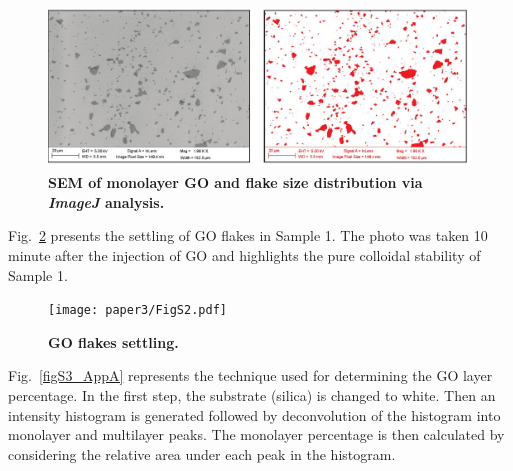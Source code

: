 \newpage
\begin{figure}[h!]
  \centering
  \includegraphics[width=6in]{paper3/FigS1.pdf}
  \caption{\textbf{SEM of monolayer GO and flake size distribution via \textit{ImageJ} analysis.}}
  \label{figS1_AppA}
\end{figure}

Fig.~\ref{figS2_AppA} presents the settling of GO flakes in Sample 1. The photo was taken 10 minute after the injection of GO and highlights the pure colloidal stability of Sample 1.

\begin{figure}[h!]
  \centering
  \texttt{[image: paper3/FigS2.pdf]}
  \caption{\textbf{GO flakes settling.}}
  \label{figS2_AppA}
\end{figure}


Fig.~\ref{figS3_AppA} represents the technique used for determining the GO layer percentage. In the first step, the substrate (silica) is changed to white. Then an intensity histogram is generated followed by deconvolution of the histogram into monolayer and multilayer peaks. The monolayer percentage is then calculated by considering the relative area under each peak in the histogram.

